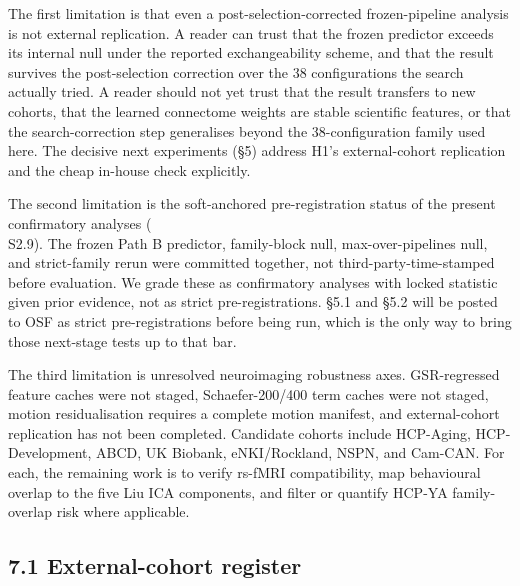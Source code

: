 \documentclass[11pt,letterpaper]{report}
\begin{document}

The first limitation is that even a post-selection-corrected frozen-pipeline analysis is not external replication. A reader can trust that the frozen predictor exceeds its internal null under the reported exchangeability scheme, and that the result survives the post-selection correction over the 38 configurations the search actually tried. A reader should not yet trust that the result transfers to new cohorts, that the learned connectome weights are stable scientific features, or that the search-correction step generalises beyond the 38-configuration family used here. The decisive next experiments (\S5) address H1's external-cohort replication and the cheap in-house check explicitly.

The second limitation is the soft-anchored pre-registration status of the present confirmatory analyses (\\S2.9). The frozen Path B predictor, family-block null, max-over-pipelines null, and strict-family rerun were committed together, not third-party-time-stamped before evaluation. We grade these as confirmatory analyses with locked statistic given prior evidence, not as strict pre-registrations. \S5.1 and \S5.2 will be posted to OSF as strict pre-registrations before being run, which is the only way to bring those next-stage tests up to that bar.

The third limitation is unresolved neuroimaging robustness axes. GSR-regressed feature caches were not staged, Schaefer-200/400 term caches were not staged, motion residualisation requires a complete motion manifest, and external-cohort replication has not been completed. Candidate cohorts include HCP-Aging, HCP-Development, ABCD, UK Biobank, eNKI/Rockland, NSPN, and Cam-CAN. For each, the remaining work is to verify rs-fMRI compatibility, map behavioural overlap to the five Liu ICA components, and filter or quantify HCP-YA family-overlap risk where applicable.

\subsection*{7.1 External-cohort register}
\end{document}
